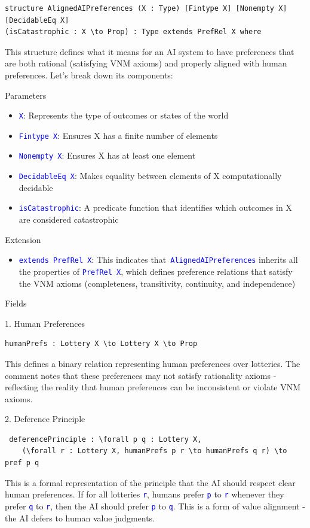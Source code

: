 \documentclass{article}
\theoremstyle{definition}
\newcommand{\tactic}[1]{\textcolor{blue}{\texttt{#1}}}
\begin{document}
\begin{lstlisting}
structure AlignedAIPreferences (X : Type) [Fintype X] [Nonempty X] [DecidableEq X]
(isCatastrophic : X \to Prop) : Type extends PrefRel X where
\end{lstlisting}
This structure defines what it means for an AI system to have preferences that are both rational (satisfying VNM axioms) and properly aligned with human preferences. Let's break down its components:

Parameters
\begin{itemize}
\item \tactic{X}: Represents the type of outcomes or states of the world

\item \tactic{Fintype X}: Ensures X has a finite number of elements

\item \tactic{Nonempty X}: Ensures X has at least one element

\item \tactic{DecidableEq X}: Makes equality between elements of X computationally decidable

\item \tactic{isCatastrophic}: A predicate function that identifies which outcomes in X are considered catastrophic
\end{itemize}
Extension
\begin{itemize}
\item \tactic{extends PrefRel X}: This indicates that\tactic{ AlignedAIPreferences} inherits all the properties of \tactic{PrefRel X}, which defines preference relations that satisfy the VNM axioms (completeness, transitivity, continuity, and independence)
\end{itemize}

Fields

1. Human Preferences
\begin{lstlisting}
humanPrefs : Lottery X \to Lottery X \to Prop
\end{lstlisting}
This defines a binary relation representing human preferences over lotteries. The comment notes that these preferences may not satisfy rationality axioms - reflecting the reality that human preferences can be inconsistent or violate VNM axioms.

2. Deference Principle
\begin{lstlisting}
 deferencePrinciple : \forall p q : Lottery X,
    (\forall r : Lottery X, humanPrefs p r \to humanPrefs q r) \to pref p q
\end{lstlisting}
This is a formal representation of the principle that the AI should respect clear human preferences. If for all lotteries \tactic{r}, humans prefer \tactic{p} to \tactic{r} whenever they prefer \tactic{q} to \tactic{r}, then the AI should prefer \tactic{p} to \tactic{q}. This is a form of value alignment - the AI defers to human value judgments.
\end{document}
